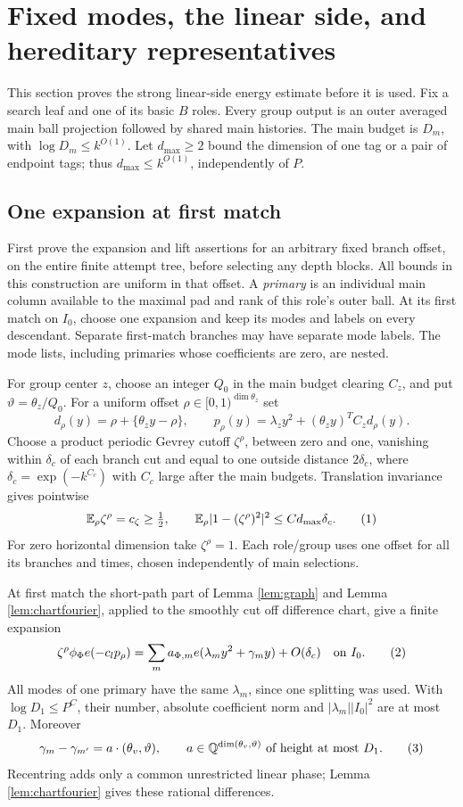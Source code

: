 \documentclass[11pt]{article}
\theoremstyle{definition}
\newcommand{\Q}{\mathbb Q}
\newcommand{\E}{\mathbb E}
\newcommand{\eqtag}[1]{\refstepcounter{equation}\tag{\theequation}\label{#1}}
\numberwithin{equation}{section}
\begin{document}
\section{Fixed modes, the linear side, and hereditary representatives}\label{sec:modes}
This section proves the strong linear-side energy estimate before it is used. Fix a search leaf and one of its basic $B$ roles. Every group output is an outer averaged main ball projection followed by shared main histories. The main budget is $D_m$, with $\log D_m\le k^{O(1)}$. Let $d_{\max}\ge2$ bound the dimension of one tag or a pair of endpoint tags; thus $d_{\max}\le k^{O(1)}$, independently of $P$.

\subsection{One expansion at first match}
First prove the expansion and lift assertions for an arbitrary fixed branch offset, on the entire finite attempt tree, before selecting any depth blocks. All bounds in this construction are uniform in that offset. A \emph{primary} is an individual main column available to the maximal pad and rank of this role's outer ball. At its first match on $I_0$, choose one expansion and keep its modes and labels on every descendant. Separate first-match branches may have separate mode labels. The mode lists, including primaries whose coefficients are zero, are nested.

For group center $z$, choose an integer $Q_0$ in the main budget clearing $C_z$, and put $\vartheta=\theta_z/Q_0$. For a uniform offset $\rho\in[0,1)^{\dim\theta_z}$ set
\[
 d_\rho(y)=\rho+\{\theta_zy-\rho\},\qquad
 p_\rho(y)=\lambda_zy^2+(\theta_zy)^TC_zd_\rho(y).
\]
Choose a product periodic Gevrey cutoff $\zeta^\rho$, between zero and one, vanishing within $\delta_c$ of each branch cut and equal to one outside distance $2\delta_c$, where $\delta_c=\exp(-k^{C_c})$ with $C_c$ large after the main budgets. Translation invariance gives pointwise
\[
 \E_\rho\zeta^\rho=c_\zeta\ge\tfrac12,
 \qquad \E_\rho|1-(\zeta^\rho)^2|^2\le Cd_{\max}\delta_c.
 \eqtag{eq:offset-mean}
\]
For zero horizontal dimension take $\zeta^\rho=1$. Each role/group uses one offset for all its branches and times, chosen independently of main selections.

At first match the short-path part of Lemma \ref{lem:graph} and Lemma \ref{lem:chartfourier}, applied to the smoothly cut off difference chart, give a finite expansion
\[
 \zeta^\rho\phi_\Phi e(-c_lp_\rho)
 =\sum_m a_{\Phi,m}e(\lambda_my^2+\gamma_my)+O(\delta_c)
 \quad\text{on }I_0.
 \eqtag{eq:firstmatch}
\]
All modes of one primary have the same $\lambda_m$, since one splitting was used. With $\log D_1\le P^C$, their number, absolute coefficient norm and $|\lambda_m||I_0|^2$ are at most $D_1$. Moreover
\[
 \gamma_m-\gamma_{m'}=a\cdot(\theta_v,\vartheta),
 \qquad a\in\Q^{\dim(\theta_v,\vartheta)}\text{ of height at most }D_1.
 \eqtag{eq:mode-differences}
\]
Recentring adds only a common unrestricted linear phase; Lemma \ref{lem:chartfourier} gives these rational differences.
\end{document}

